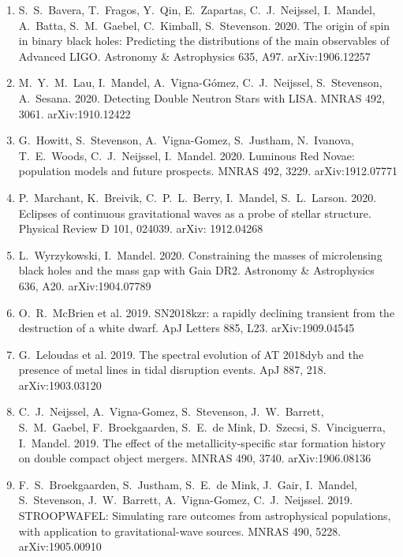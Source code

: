 \documentclass[margin,line]{res}
\begin{document}
\begin{resume}
\begin{enumerate}
\item S.~S.~Bavera, T.~Fragos, Y.~Qin, E.~Zapartas, C.~J.~Neijssel, I.~Mandel, A.~Batta, S.~M.~Gaebel, C.~Kimball, S.~Stevenson.  2020.  The origin of spin in binary black holes: Predicting the distributions of the main observables of Advanced LIGO.  Astronomy \& Astrophysics 635, A97.  arXiv:1906.12257

\item M.~Y.~M.~Lau, I.~Mandel, A.~Vigna-G\'{o}mez, C.~J.~Neijssel, S.~Stevenson, A.~Sesana.  2020.  Detecting Double Neutron Stars with LISA.  MNRAS 492, 3061.  arXiv:1910.12422

\item G.~Howitt, S.~Stevenson, A.~Vigna-Gomez, S.~Justham, N.~Ivanova, T.~E.~Woods, C.~J.~Neijssel, I.~Mandel.  2020.  Luminous Red Novae: population models and future prospects.  MNRAS 492, 3229.  arXiv:1912.07771 

\item P.~Marchant, K.~Breivik, C.~P.~L.~Berry, I.~Mandel, S.~L.~Larson. 2020.  Eclipses of continuous gravitational waves as a probe of stellar structure.  Physical Review D 101, 024039.
arXiv: 1912.04268

\item L.~Wyrzykowski, I.~Mandel.  2020.  Constraining the masses of microlensing black holes and the mass gap with Gaia DR2.  Astronomy \& Astrophysics 636, A20.  arXiv:1904.07789

\item O.~R.~McBrien et al. 2019. SN2018kzr: a rapidly declining transient from the destruction of a white dwarf. ApJ Letters 885, L23.  arXiv:1909.04545

\item G.~Leloudas et al.  2019. The spectral evolution of AT 2018dyb and the presence of metal lines in tidal disruption events.  ApJ 887, 218.  arXiv:1903.03120

\item C.~J.~Neijssel, A.~Vigna-Gomez, S.~Stevenson, J.~W.~Barrett, S.~M.~Gaebel, F.~Broekgaarden, S.~E.~de Mink, D.~Szecsi, S.~Vinciguerra, I.~Mandel.  2019. The effect of the metallicity-specific star formation history on double compact object mergers.  MNRAS 490, 3740.  arXiv:1906.08136

\item F.~S.~Broekgaarden, S.~Justham, S.~E.~de Mink, J.~Gair, I.~Mandel, S.~Stevenson, J.~W.~Barrett, A.~Vigna-Gomez, C.~J.~Neijssel.  2019. STROOPWAFEL: Simulating rare outcomes from astrophysical populations, with application to gravitational-wave sources.  MNRAS 490, 5228.  arXiv:1905.00910


\end{enumerate}
\end{resume}
\end{document}
